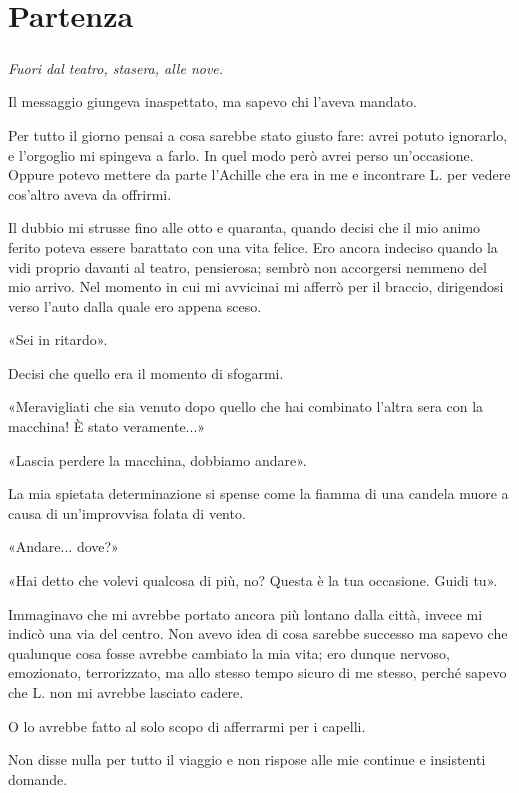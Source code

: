 \documentclass[a4paper,12pt]{book}
\begin{document}
\chapter{Partenza}

\paragraph{}
\emph{Fuori dal teatro, stasera, alle nove.}

Il messaggio giungeva inaspettato, ma sapevo chi l'aveva mandato.

Per tutto il giorno pensai a cosa sarebbe stato giusto fare: avrei potuto
ignorarlo, e l'orgoglio mi spingeva a farlo. In quel modo però avrei perso
un'occasione. Oppure potevo mettere da parte l'Achille che era in me e
incontrare L. per vedere cos'altro aveva da offrirmi.

Il dubbio mi strusse fino alle otto e quaranta, quando decisi che il mio animo
ferito poteva essere barattato con una vita felice. Ero ancora indeciso quando
la vidi proprio davanti al teatro, pensierosa; sembrò non accorgersi nemmeno
del mio arrivo. Nel momento in cui mi avvicinai mi afferrò per il braccio,
dirigendosi verso l'auto dalla quale ero appena sceso.

«Sei in ritardo».

Decisi che quello era il momento di sfogarmi.

«Meravigliati che sia venuto dopo quello che hai combinato l'altra sera con
la macchina! È stato veramente...»

«Lascia perdere la macchina, dobbiamo andare».

La mia spietata determinazione si spense come la fiamma di una candela muore a
causa di un'improvvisa folata di vento.

«Andare... dove?»

«Hai detto che volevi qualcosa di più, no? Questa è la tua occasione. Guidi tu».

Immaginavo che mi avrebbe portato ancora più lontano dalla città, invece mi
indicò una via del centro. Non avevo idea di cosa sarebbe successo ma sapevo
che qualunque cosa fosse avrebbe cambiato la mia vita; ero dunque nervoso,
emozionato, terrorizzato, ma allo stesso tempo sicuro di me stesso, perché
sapevo che L. non mi avrebbe lasciato cadere.

O lo avrebbe fatto al solo scopo di afferrarmi per i capelli.

Non disse nulla per tutto il viaggio e non rispose alle mie continue e
insistenti domande.
\end{document}
